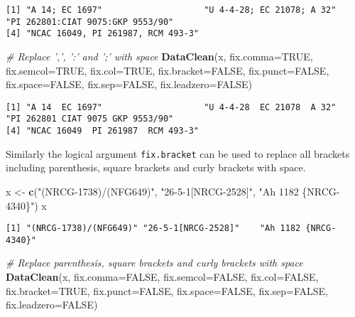 \documentclass[
]{article}
\newenvironment{Shaded}{\begin{snugshade}}{\end{snugshade}}
\newcommand{\CommentTok}[1]{\textcolor[rgb]{0.56,0.35,0.01}{\textit{#1}}}
\newcommand{\DataTypeTok}[1]{\textcolor[rgb]{0.13,0.29,0.53}{#1}}
\newcommand{\KeywordTok}[1]{\textcolor[rgb]{0.13,0.29,0.53}{\textbf{#1}}}
\newcommand{\NormalTok}[1]{#1}
\newcommand{\OtherTok}[1]{\textcolor[rgb]{0.56,0.35,0.01}{#1}}
\newcommand{\StringTok}[1]{\textcolor[rgb]{0.31,0.60,0.02}{#1}}
\begin{document}
\begin{verbatim}
[1] "A 14; EC 1697"                    "U 4-4-28; EC 21078; A 32"         "PI 262801:CIAT 9075:GKP 9553/90" 
[4] "NCAC 16049, PI 261987, RCM 493-3"
\end{verbatim}

\begin{Shaded}
\begin{Highlighting}[]
\CommentTok{# Replace ',', ':' and ';' with space}
\KeywordTok{DataClean}\NormalTok{(x, }\DataTypeTok{fix.comma=}\OtherTok{TRUE}\NormalTok{, }\DataTypeTok{fix.semcol=}\OtherTok{TRUE}\NormalTok{, }\DataTypeTok{fix.col=}\OtherTok{TRUE}\NormalTok{,}
          \DataTypeTok{fix.bracket=}\OtherTok{FALSE}\NormalTok{, }\DataTypeTok{fix.punct=}\OtherTok{FALSE}\NormalTok{, }\DataTypeTok{fix.space=}\OtherTok{FALSE}\NormalTok{, }\DataTypeTok{fix.sep=}\OtherTok{FALSE}\NormalTok{,}
          \DataTypeTok{fix.leadzero=}\OtherTok{FALSE}\NormalTok{)}
\end{Highlighting}
\end{Shaded}

\begin{verbatim}
[1] "A 14  EC 1697"                    "U 4-4-28  EC 21078  A 32"         "PI 262801 CIAT 9075 GKP 9553/90" 
[4] "NCAC 16049  PI 261987  RCM 493-3"
\end{verbatim}

Similarly the logical argument \texttt{fix.bracket} can be used to
replace all brackets including parenthesis, square brackets and curly
brackets with space.

\begin{Shaded}
\begin{Highlighting}[]
\NormalTok{x <-}\StringTok{ }\KeywordTok{c}\NormalTok{(}\StringTok{"(NRCG-1738)/(NFG649)"}\NormalTok{, }\StringTok{"26-5-1[NRCG-2528]"}\NormalTok{, }\StringTok{"Ah 1182 \{NRCG-4340\}"}\NormalTok{)}
\NormalTok{x}
\end{Highlighting}
\end{Shaded}

\begin{verbatim}
[1] "(NRCG-1738)/(NFG649)" "26-5-1[NRCG-2528]"    "Ah 1182 {NRCG-4340}" 
\end{verbatim}

\begin{Shaded}
\begin{Highlighting}[]
\CommentTok{# Replace parenthesis, square brackets and curly brackets with space}
\KeywordTok{DataClean}\NormalTok{(x, }\DataTypeTok{fix.comma=}\OtherTok{FALSE}\NormalTok{, }\DataTypeTok{fix.semcol=}\OtherTok{FALSE}\NormalTok{, }\DataTypeTok{fix.col=}\OtherTok{FALSE}\NormalTok{,}
          \DataTypeTok{fix.bracket=}\OtherTok{TRUE}\NormalTok{,}
          \DataTypeTok{fix.punct=}\OtherTok{FALSE}\NormalTok{, }\DataTypeTok{fix.space=}\OtherTok{FALSE}\NormalTok{, }\DataTypeTok{fix.sep=}\OtherTok{FALSE}\NormalTok{, }\DataTypeTok{fix.leadzero=}\OtherTok{FALSE}\NormalTok{)}
\end{Highlighting}
\end{Shaded}
\end{document}
